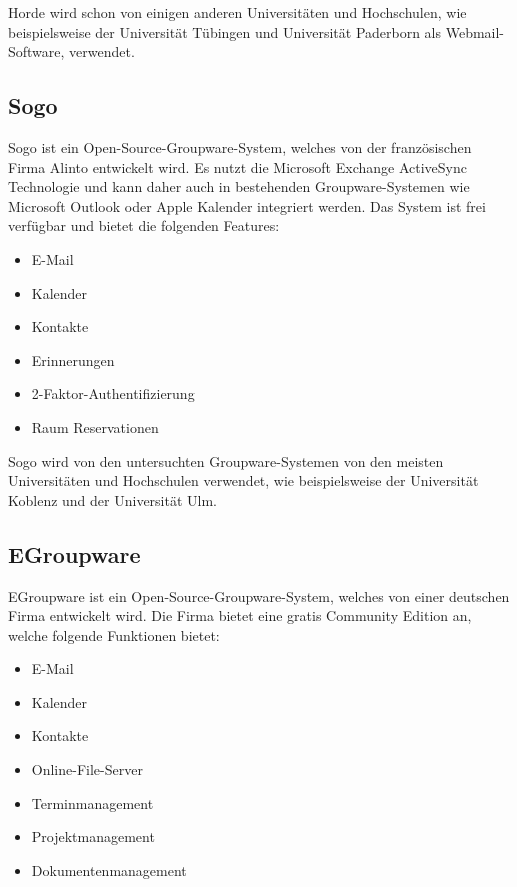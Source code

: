 Horde wird schon von einigen anderen Universitäten und Hochschulen, wie beispielsweise der Universität Tübingen und Universität Paderborn als Webmail-Software, verwendet.

\subsection{Sogo}

Sogo ist ein Open-Source-Groupware-System, welches von der französischen Firma Alinto entwickelt wird.
Es nutzt die Microsoft Exchange ActiveSync Technologie und kann daher auch in bestehenden Groupware-Systemen wie Microsoft Outlook oder Apple Kalender integriert werden.
Das System ist frei verfügbar und bietet die folgenden Features:

\begin{itemize}
    \item E-Mail
    \item Kalender
    \item Kontakte
    \item Erinnerungen
    \item 2-Faktor-Authentifizierung
    \item Raum Reservationen
\end{itemize}
\autocite[][]{sogo}

Sogo wird von den untersuchten Groupware-Systemen von den meisten Universitäten und Hochschulen verwendet, wie beispielsweise der Universität Koblenz und der Universität Ulm.

\subsection{EGroupware}

EGroupware ist ein Open-Source-Groupware-System, welches von einer deutschen Firma entwickelt wird.
Die Firma bietet eine gratis Community Edition an, welche folgende Funktionen bietet:

\begin{itemize}
    \item E-Mail
    \item Kalender
    \item Kontakte
    \item Online-File-Server
    \item Terminmanagement
    \item Projektmanagement
    \item Dokumentenmanagement
\end{itemize}

